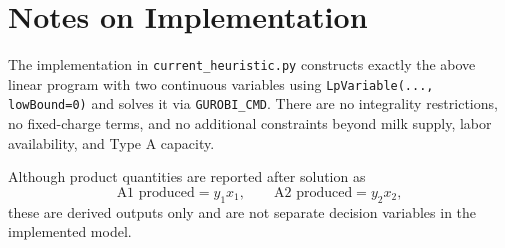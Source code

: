 \section*{Notes on Implementation}

The implementation in \texttt{current\_heuristic.py} constructs exactly the above linear program with two continuous variables using \texttt{LpVariable(..., lowBound=0)} and solves it via \texttt{GUROBI\_CMD}. There are no integrality restrictions, no fixed-charge terms, and no additional constraints beyond milk supply, labor availability, and Type A capacity.

Although product quantities are reported after solution as
\[
\text{A1 produced} = y_1 x_1,\qquad \text{A2 produced} = y_2 x_2,
\]
these are derived outputs only and are not separate decision variables in the implemented model.
